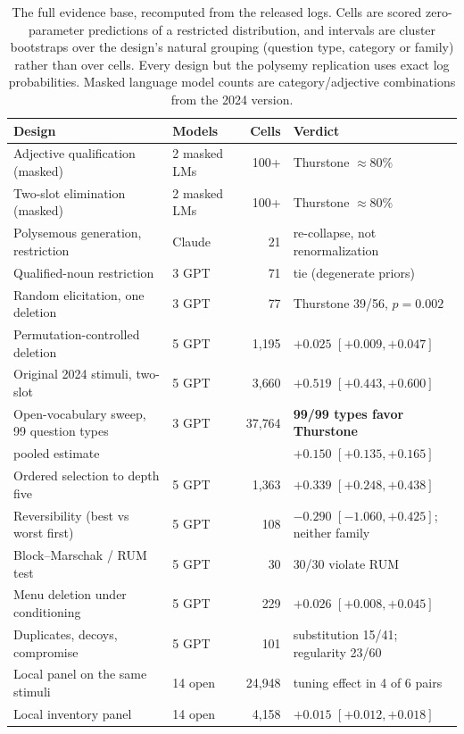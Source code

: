 \documentclass[11pt]{article}
\begin{document}
\begin{table}[ht]
\centering
\small
\begin{tabular}{llrl}
\toprule
Design & Models & Cells & Verdict \\
\midrule
Adjective qualification (masked) & 2 masked LMs & 100+ & Thurstone $\approx 80\%$ \\
Two-slot elimination (masked) & 2 masked LMs & 100+ & Thurstone $\approx 80\%$ \\
Polysemous generation, restriction & Claude & 21 & re-collapse, not renormalization \\
Qualified-noun restriction & 3 GPT & 71 & tie (degenerate priors) \\
Random elicitation, one deletion & 3 GPT & 77 & Thurstone 39/56, $p = 0.002$ \\
Permutation-controlled deletion & 5 GPT & 1{,}195 & $+0.025$ $[+0.009, +0.047]$ \\
Original 2024 stimuli, two-slot & 5 GPT & 3{,}660 & $+0.519$ $[+0.443, +0.600]$ \\
Open-vocabulary sweep, 99 question types & 3 GPT & 37{,}764 & \textbf{99/99 types favor Thurstone} \\
\quad pooled estimate & & & $+0.150$ $[+0.135, +0.165]$ \\
Ordered selection to depth five & 5 GPT & 1{,}363 & $+0.339$ $[+0.248, +0.438]$ \\
Reversibility (best vs worst first) & 5 GPT & 108 & $-0.290$ $[-1.060, +0.425]$; neither family \\
Block--Marschak / RUM test & 5 GPT & 30 & 30/30 violate RUM \\
Menu deletion under conditioning & 5 GPT & 229 & $+0.026$ $[+0.008, +0.045]$ \\
Duplicates, decoys, compromise & 5 GPT & 101 & substitution 15/41; regularity 23/60 \\
Local panel on the same stimuli & 14 open & 24{,}948 & tuning effect in 4 of 6 pairs \\
Local inventory panel & 14 open & 4{,}158 & $+0.015$ $[+0.012, +0.018]$ \\
\bottomrule
\end{tabular}
\caption{The full evidence base, recomputed from the released logs. Cells are
scored zero-parameter predictions of a restricted distribution, and intervals
are cluster bootstraps over the design's natural grouping (question type,
category or family) rather than over cells. Every design but the polysemy
replication uses exact log probabilities. Masked language model counts are
category/adjective combinations from the 2024 version.}
\label{tab:designs}
\end{table}
\end{document}
